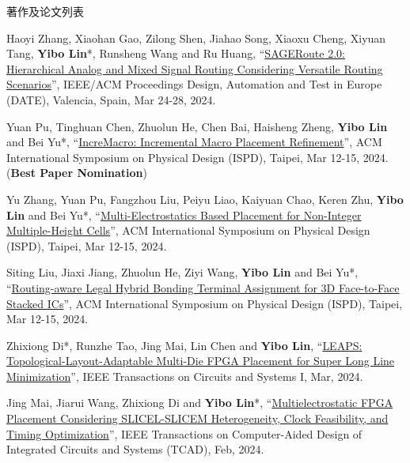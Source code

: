 \begin{rSection}{著作及论文列表}
\begin{description}[font=\normalfont, rightmargin=2em]
{}
            

\item[{[C140]}]{
        Haoyi Zhang, Xiaohan Gao, Zilong Shen, Jiahao Song, Xiaoxu Cheng, Xiyuan Tang, \textbf{Yibo Lin}*, Runsheng Wang and Ru Huang, 
    ``\href{https://ieeexplore.ieee.org/document/10546542}{SAGERoute 2.0: Hierarchical Analog and Mixed Signal Routing Considering Versatile Routing Scenarios}'', 
    IEEE/ACM Proceedings Design, Automation and Test in Europe (DATE), Valencia, Spain, Mar 24-28, 2024.
    
}
            

\item[{[C139]}]{
        Yuan Pu, Tinghuan Chen, Zhuolun He, Chen Bai, Haisheng Zheng, \textbf{Yibo Lin} and Bei Yu*, 
    ``\href{https://doi.org/10.1145/3626184.3633321}{IncreMacro: Incremental Macro Placement Refinement}'', 
    ACM International Symposium on Physical Design (ISPD), Taipei, Mar 12-15, 2024.
    (\textbf{Best Paper Nomination})
}
            

\item[{[C138]}]{
        Yu Zhang, Yuan Pu, Fangzhou Liu, Peiyu Liao, Kaiyuan Chao, Keren Zhu, \textbf{Yibo Lin} and Bei Yu*, 
    ``\href{https://doi.org/10.1145/3626184.3633320}{Multi-Electrostatics Based Placement for Non-Integer Multiple-Height Cells}'', 
    ACM International Symposium on Physical Design (ISPD), Taipei, Mar 12-15, 2024.
    
}
            

\item[{[C137]}]{
        Siting Liu, Jiaxi Jiang, Zhuolun He, Ziyi Wang, \textbf{Yibo Lin} and Bei Yu*, 
    ``\href{https://doi.org/10.1145/3626184.3633322}{Routing-aware Legal Hybrid Bonding Terminal Assignment for 3D Face-to-Face Stacked ICs}'', 
    ACM International Symposium on Physical Design (ISPD), Taipei, Mar 12-15, 2024.
    
}
            

\item[{[J136]}]{
        Zhixiong Di*, Runzhe Tao, Jing Mai, Lin Chen and \textbf{Yibo Lin}, 
    ``\href{https://doi.org/10.1109/TCSI.2023.3340554}{LEAPS: Topological-Layout-Adaptable Multi-Die FPGA Placement for Super Long Line Minimization}'', 
    IEEE Transactions on Circuits and Systems I, Mar, 2024.
    
}
            

\item[{[J135]}]{
        Jing Mai, Jiarui Wang, Zhixiong Di and \textbf{Yibo Lin}*, 
    ``\href{https://doi.org/10.1109/TCAD.2023.3313101}{Multielectrostatic FPGA Placement Considering SLICEL-SLICEM Heterogeneity, Clock Feasibility, and Timing Optimization}'', 
    IEEE Transactions on Computer-Aided Design of Integrated Circuits and Systems (TCAD), Feb, 2024.
    
}
\end{description}
\end{rSection}
